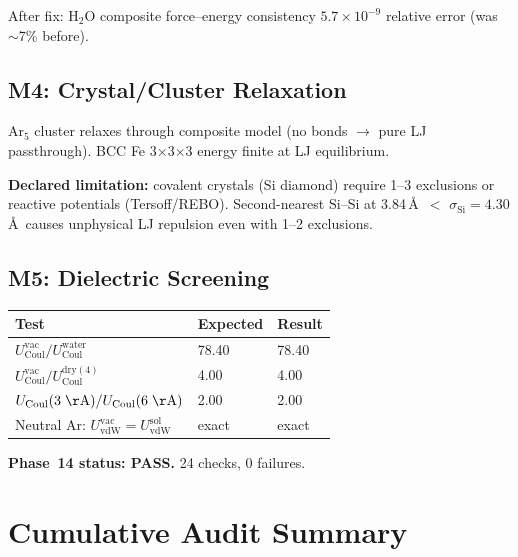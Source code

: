 \documentclass[11pt]{article}
\begin{document}
After fix: H$_2$O composite force--energy consistency $5.7\times 10^{-9}$
relative error (was $\sim$7\% before).

\subsection{M4: Crystal/Cluster Relaxation}

Ar$_5$ cluster relaxes through composite model (no bonds $\to$ pure LJ
passthrough). BCC Fe 3$\times$3$\times$3 energy finite at LJ equilibrium.

\textbf{Declared limitation:} covalent crystals (Si diamond) require
1--3 exclusions or reactive potentials (Tersoff/REBO). Second-nearest
Si--Si at 3.84\,\AA\ $<$ $\sigma_{\mathrm{Si}} = 4.30$\,\AA\ causes
unphysical LJ repulsion even with 1--2 exclusions.

\subsection{M5: Dielectric Screening}

\begin{center}
\begin{tabular}{lll}
\toprule
Test & Expected & Result \\
\midrule
$U_{\mathrm{Coul}}^{\mathrm{vac}} / U_{\mathrm{Coul}}^{\mathrm{water}}$ & 78.40 & 78.40 \\
$U_{\mathrm{Coul}}^{\mathrm{vac}} / U_{\mathrm{Coul}}^{\mathrm{dry}(4)}$ & 4.00 & 4.00 \\
$U_{\mathrm{Coul}}(3\;\mathrm{\AA}) / U_{\mathrm{Coul}}(6\;\mathrm{\AA})$ & 2.00 & 2.00 \\
Neutral Ar: $U_{\mathrm{vdW}}^{\mathrm{vac}} = U_{\mathrm{vdW}}^{\mathrm{sol}}$ & exact & exact \\
\bottomrule
\end{tabular}
\end{center}

\textbf{Phase~14 status: PASS.}  24 checks, 0 failures.


\section{Cumulative Audit Summary}
\end{document}
